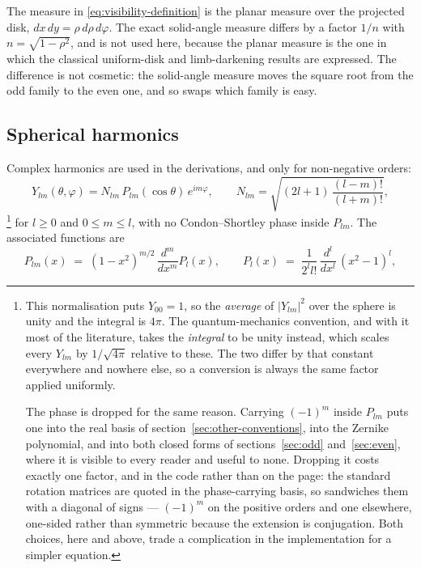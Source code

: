 The measure in \eqref{eq:visibility-definition} is the planar measure over the
projected disk, $dx\,dy = \rho\,d\rho\,d\varphi$.  The exact solid-angle
measure differs by a factor $1/n$ with $n = \sqrt{1-\rho^2}$, and is not used
here, because the planar measure is the one in which the classical uniform-disk
and limb-darkening results are expressed.  The difference is not cosmetic: the
solid-angle measure moves the square root from the odd family to the even one,
and so swaps which family is easy.

\subsection{Spherical harmonics}

Complex harmonics are used in the derivations, and only for non-negative orders:
\begin{equation}
  Y_{lm}(\theta,\varphi) = N_{lm}\, P_{lm}(\cos\theta)\, e^{im\varphi},
  \qquad
  N_{lm} = \sqrt{(2l+1)\,\frac{(l-m)!}{(l+m)!}} ,
  \label{eq:ylm}
\end{equation}
\footnote{This normalisation puts $Y_{00} = 1$, so the \emph{average} of $|Y_{lm}|^2$ over the
sphere is unity and the integral is $4\pi$.  The quantum-mechanics convention, and with it
most of the literature, takes the \emph{integral} to be unity instead, which scales every
$Y_{lm}$ by $1/\sqrt{4\pi}$ relative to these.  The two differ by that constant everywhere and
nowhere else, so a conversion is always the same factor applied uniformly.

The phase is dropped for the same reason.  Carrying $(-1)^m$ inside $P_{lm}$ puts one into
the real basis of section~\ref{sec:other-conventions}, into the Zernike polynomial, and into
both closed forms of sections~\ref{sec:odd} and~\ref{sec:even}, where it is visible to every
reader and useful to none.  Dropping it costs exactly one factor, and in the code rather than
on the page: the standard rotation matrices are quoted in the phase-carrying basis, so
 sandwiches them with a diagonal of signs --- $(-1)^m$ on the
positive orders and one elsewhere, one-sided rather than symmetric because the extension is
conjugation.  Both
choices, here and above, trade a complication in the implementation for a simpler equation.}
for $l \ge 0$ and $0 \le m \le l$, with no Condon--Shortley phase inside $P_{lm}$.  The
associated functions are
\begin{equation}
  P_{lm}(x) \;=\; (1-x^{2})^{m/2}\,\frac{d^{m}}{dx^{m}}P_l(x) , \qquad
  P_l(x) \;=\; \frac{1}{2^{l}l!}\,\frac{d^{l}}{dx^{l}}\,(x^{2}-1)^{l} ,
  \label{eq:associated-legendre}
\end{equation}
